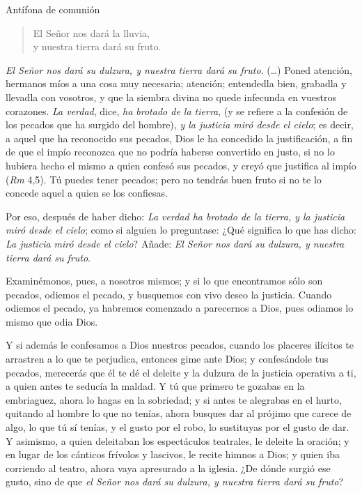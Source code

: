 \begin{liturgiabox}{Antífona de comunión }
	\begin{quote}
		El Señor nos dará la lluvia, \\y nuestra tierra dará su fruto.	
	\end{quote}	
	
	\begin{liturgiatext}
		
		{}\emph{El Señor nos dará su dulzura, y nuestra tierra dará su fruto}. (\ldots{}) Poned atención, hermanos míos a una cosa muy necesaria; atención; entendedla bien, grabadla y llevadla con vosotros, y que la siembra divina no quede infecunda en vuestros corazones. \emph{La verdad}, dice, \emph{ha brotado de la tierra}, (y se refiere a la confesión de los pecados que ha surgido del hombre), \emph{y la justicia miró desde el cielo}; es decir, a aquel que ha reconocido sus pecados, Dios le ha concedido la justificación, a fin de que el impío reconozca que no podría haberse convertido en justo, si no lo hubiera hecho el mismo a quien confesó sus pecados, y creyó que justifica al impío (\emph{Rm} 4,5). Tú puedes tener pecados; pero no tendrás buen fruto si no te lo concede aquel a quien se los confiesas. 
		
		Por eso, después de haber dicho: \emph{La verdad ha brotado de la tierra, y la justicia miró desde el cielo}; como si alguien lo preguntase: ¿Qué significa lo que has dicho: \emph{La justicia miró desde el cielo}? Añade: \emph{El Señor nos dará su dulzura, y nuestra tierra dará su fruto}. 
		
		Examinémonos, pues, a nosotros mismos; y si lo que encontramos sólo son pecados, odiemos el pecado, y busquemos con vivo deseo la justicia. Cuando odiemos el pecado, ya habremos comenzado a parecernos a Dios, pues odiamos lo mismo que odia Dios. 
		
		Y si además le confesamos a Dios nuestros pecados, cuando los placeres ilícitos te arrastren a lo que te perjudica, entonces gime ante Dios; y confesándole tus pecados, merecerás que él te dé el deleite y la dulzura de la justicia operativa a ti, a quien antes te seducía la maldad. Y tú que primero te gozabas en la embriaguez, ahora lo hagas en la sobriedad; y si antes te alegrabas en el hurto, quitando al hombre lo que no tenías, ahora busques dar al prójimo que carece de algo, lo que tú sí tenías, y el gusto por el robo, lo sustituyas por el gusto de dar. Y asimismo, a quien deleitaban los espectáculos teatrales, le deleite la oración; y en lugar de los cánticos frívolos y lascivos, le recite himnos a Dios; y quien iba corriendo al teatro, ahora vaya apresurado a la iglesia. ¿De dónde surgió ese gusto, sino de que \emph{el Señor nos dará su dulzura, y nuestra tierra dará su fruto}? 
		

\end{liturgiatext}
\end{liturgiabox}
